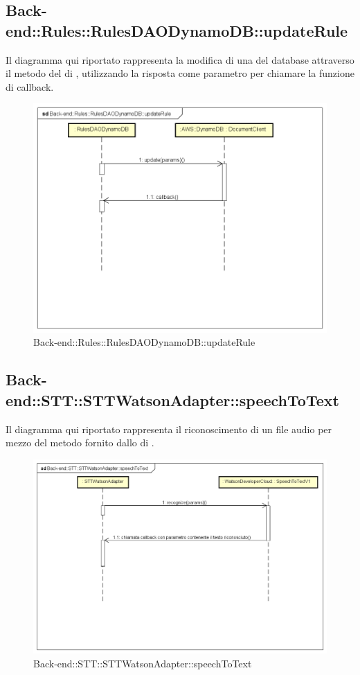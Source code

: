 \subsection{Back-end::Rules::RulesDAODynamoDB::updateRule}
Il diagramma qui riportato rappresenta la modifica di una  del database attraverso il metodo  del  di , utilizzando la risposta come parametro per chiamare la funzione di callback.
 \begin{figure}[h] \centering \includegraphics[width=\textwidth,height=\textheight,keepaspectratio]{images/diagrams/back-end/Ufficial_Backend/Back-endRulesRulesDAODynamoDBupdateRule.png} 	\caption{Back-end::Rules::RulesDAODynamoDB::updateRule}
\end{figure}
\newpage

\subsection{Back-end::STT::STTWatsonAdapter::speechToText}
Il diagramma qui riportato rappresenta il riconoscimento di un file audio per mezzo del metodo  fornito dallo  di .
\begin{figure}[h] \centering \includegraphics[width=\textwidth,height=\textheight,keepaspectratio]{images/diagrams/back-end/Ufficial_Backend/Back-endSTTSTTWatsonAdapterspeechToText.png} 	\caption{Back-end::STT::STTWatsonAdapter::speechToText}
\end{figure}
